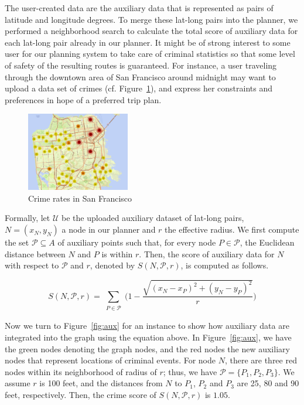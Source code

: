 \documentclass[letterpaper]{article}
\newcommand{\cU}{\mathcal{U}}
\newcommand{\cP}{\mathcal{P}}
\newcommand{\figref}[1]{Figure~\ref{fig:#1}}
\begin{document}
The user-created data are the auxiliary data that is represented as pairs
of latitude and longitude degrees.
To merge these lat-long pairs into the planner, we performed a neighborhood
search to calculate the total score of auxiliary data for each 
lat-long pair already in our planner.
It might be of strong interest to some user for our planning
system to take care of criminal statistics so that some level of safety
of the resulting routes is guaranteed.
For instance, a user traveling through the downtown area of San Francisco
around midnight may want to upload a data set of crimes (cf. \figref{sf_crime}), 
and express her constraints and preferences in hope of a preferred trip plan.

\begin{figure}[!ht]
  \centering
    \includegraphics[width=0.4\textwidth]{figs/sub_sf_crime_July2015.png}
  \caption{Crime rates in San Francisco\label{fig:sf_crime}}
\end{figure}

Formally, let $\cU$ be the uploaded auxiliary dataset of lat-long pairs, 
$N=(x_N,y_N)$ a node in our planner and $r$ the effective radius.
We first compute the set $\cP \subseteq A$ of auxiliary points such that,
for every node $P \in \cP$, the Euclidean distance between $N$ and $P$
is within $r$.
Then, the score of auxiliary data for $N$ with respect to $\cP$ and $r$,
denoted by $S(N,\cP,r)$, is computed as follows.

\begin{equation*}
	S(N,\cP,r) = \sum_{\substack{P \in \cP}} 
		\Big(1 - \frac{\sqrt{(x_N-x_P)^2+(y_N-y_P)^2}}{r}\Big)
\end{equation*}

Now we turn to \figref{aux} for an instance to show how auxiliary data
are integrated into the graph using the equation above.
In \figref{aux}, we have the green nodes denoting the graph nodes, 
and the red nodes the new auxiliary nodes that represent locations
of criminal events.
For node $N$, there are three red nodes within its neighborhood of
radius of $r$; thus, we have $\cP=\{P_1,P_2,P_3\}$.
We assume $r$ is 100 feet, and the distances from $N$ to $P_1$,
$P_2$ and $P_3$ are 25, 80 and 90 feet, respectively.
Then, the crime score of $S(N,\cP,r)$ is $1.05$.
\end{document}
